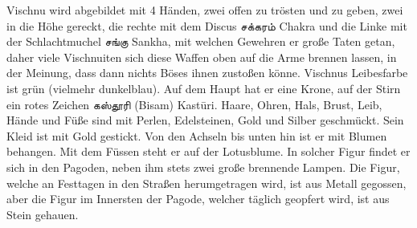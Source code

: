\documentclass{article}
\newcommand{\TamilText}[1]{\texttamil{#1}}
\newcommand{\tam}[1]{\TamilText{#1}}
\begin{document}
Vischnu wird abgebildet mit 4 Händen, zwei offen zu trösten und zu geben, zwei in die Höhe gereckt, die rechte mit dem Discus \tam{சக்கரம்} Chakra und die Linke mit der Schlachtmuchel \tam{சங்கு} Sankha, mit welchen Gewehren er große Taten getan, daher viele Vischnuiten sich diese Waffen oben auf die Arme brennen lassen, in der Meinung, dass dann nichts Böses ihnen zustoßen könne. Vischnus Leibesfarbe ist grün (vielmehr dunkelblau). Auf dem Haupt hat er eine Krone, auf der Stirn ein rotes Zeichen \tam{கஸ்தூரி} (Bisam) Kast\={u}ri. Haare, Ohren, Hals, Brust, Leib, Hände und Füße sind mit Perlen, Edelsteinen, Gold und Silber geschmückt. Sein Kleid ist mit Gold gestickt. Von den Achseln bis unten hin ist er mit Blumen behangen. Mit dem Füssen steht er auf der Lotusblume. In solcher Figur findet er sich in den Pagoden, neben ihm stets zwei große brennende Lampen. Die Figur, welche an Festtagen in den Straßen herumgetragen wird, ist aus Metall gegossen, aber die Figur im Innersten der Pagode, welcher täglich geopfert wird, ist aus Stein gehauen.
\end{document}
